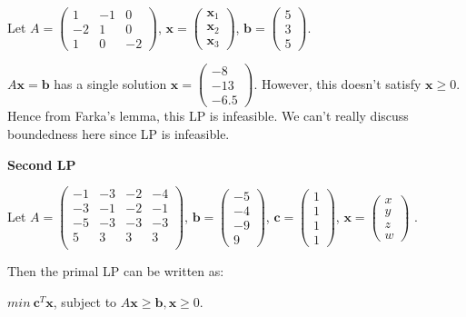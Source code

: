 \documentclass[11pt]{article}
\newcommand{\bx}{\mathbf{x}}
\begin{document}
Let 
$A = 
\begin{pmatrix}
1 & -1 & 0 \\
-2 & 1 & 0 \\
1 & 0 & -2 
\end{pmatrix}$,
$\bx = 
\begin{pmatrix}
\bx_1 \\
\bx_2 \\
\bx_3
\end{pmatrix}$,
$\textbf{b} = 
\begin{pmatrix}
5 \\
3 \\
5
\end{pmatrix}$.

$A\bx = \textbf{b}$ has a single solution $\bx = \begin{pmatrix}
-8 \\
-13 \\
-6.5
\end{pmatrix}$.
However, this doesn't satisfy $\bx \geq 0$. Hence from Farka's lemma, this LP is infeasible. We can't really discuss boundedness here since LP is infeasible.

\textbf{Second LP}

Let 
$A = 
\begin{pmatrix}
-1 & -3 & -2 & -4 \\
-3 & -1 & -2 & -1 \\
-5 & -3 & -3 & -3 \\
5 & 3 & 3 & 3 \\ 
\end{pmatrix}$,
$\textbf{b} = 
\begin{pmatrix}
-5 \\
-4 \\
-9 \\
9
\end{pmatrix}$,
$\textbf{c} = 
\begin{pmatrix}
1 \\
1 \\
1 \\
1
\end{pmatrix}$,
$\textbf{x} = 
\begin{pmatrix}
x \\
y \\
z \\
w
\end{pmatrix}$
.

Then the primal LP can be written as:

$min \ \textbf{c}^T \bx$, subject to $A\bx \geq \textbf{b}, \bx\geq 0$.
\end{document}

